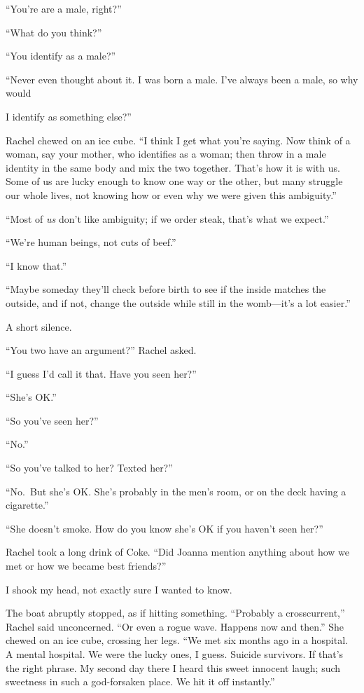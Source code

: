 ``You're are a male, right?''

``What do you think?''

``You identify as a male?''

``Never even thought about it. I was born a male. I've always been a
male, so why would

I identify as something else?''

Rachel chewed on an ice cube. ``I think I get what you're saying. Now
think of a woman, say your mother, who identifies as a woman; then throw
in a male identity in the same body and mix the two together. That's how
it is with us. Some of us are lucky enough to know one way or the other,
but many struggle our whole lives, not knowing how or even why we were
given this ambiguity.''

``Most of \emph{us} don't like ambiguity; if we order steak, that's what
we expect.''

``We're human beings, not cuts of beef.''

``I know that.''

``Maybe someday they'll check before birth to see if the inside matches
the outside, and if not, change the outside while still in the
womb---it's a lot easier.''

A short silence.

``You two have an argument?'' Rachel asked.

``I guess I'd call it that. Have you seen her?''

``She's OK.''

``So you've seen her?''

``No.''

``So you've talked to her? Texted her?''

``No.~But she's OK. She's probably in the men's room, or on the deck
having a cigarette.''

``She doesn't smoke. How do you know she's OK if you haven't seen her?''

Rachel took a long drink of Coke. ``Did Joanna mention anything about
how we met or how we became best friends?''

I shook my head, not exactly sure I wanted to know.

The boat abruptly stopped, as if hitting something. ``Probably a
crosscurrent,'' Rachel said unconcerned. ``Or even a rogue wave. Happens
now and then.'' She chewed on an ice cube, crossing her legs. ``We met
six months ago in a hospital. A mental hospital. We were the lucky ones,
I guess. Suicide survivors. If that's the right phrase. My second day
there I heard this sweet innocent laugh; such sweetness in such a
god-forsaken place. We hit it off instantly.''

